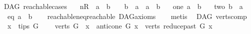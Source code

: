 \begin{isabellebody}
\endisadelimdocument
%
\isatagdocument
%
\isamarkuptrue%
%
\endisatagdocument
{\isafolddocument}%
%
\isadelimdocument
%
\endisadelimdocument
{}\isamarkupfalse%
\ {\isacharparenleft}{\kern0pt}\ DAG{\isacharparenright}{\kern0pt}\ reachable{}{\isacharunderscore}{\kern0pt}cases{\isacharcolon}{\kern0pt}\isanewline
\ \ \ {\isacharparenleft}{\kern0pt}nR{\isacharparenright}{\kern0pt}\ {\isachardoublequoteopen}{\isasymnot}\ a\ {\isasymrightarrow}\isactrlsup {\isacharplus}{\kern0pt}\ b\ {\isasymand}\ {\isasymnot}\ \ b\ {\isasymrightarrow}\isactrlsup {\isacharplus}{\kern0pt}\ a\ {\isasymand}\ a\ {\isasymnoteq}\ b{\isachardoublequoteclose}\isanewline
\ \ {\isacharbar}{\kern0pt}\ {\isacharparenleft}{\kern0pt}one{\isacharparenright}{\kern0pt}\ {\isachardoublequoteopen}a\ {\isasymrightarrow}\isactrlsup {\isacharplus}{\kern0pt}\ b{\isachardoublequoteclose}\isanewline
\ \ {\isacharbar}{\kern0pt}\ {\isacharparenleft}{\kern0pt}two{\isacharparenright}{\kern0pt}\ {\isachardoublequoteopen}b\ {\isasymrightarrow}\isactrlsup {\isacharplus}{\kern0pt}\ a{\isachardoublequoteclose}\isanewline
\ \ {\isacharbar}{\kern0pt}\ {\isacharparenleft}{\kern0pt}eq{\isacharparenright}{\kern0pt}\ {\isachardoublequoteopen}a\ {\isacharequal}{\kern0pt}\ b{\isachardoublequoteclose}\isanewline
%
\isadelimproof
\ \ %
\endisadelimproof
%
\isatagproof
{}\isamarkupfalse%
\ reachable{\isacharunderscore}{\kern0pt}neq{\isacharunderscore}{\kern0pt}reachable{}\ DAG{\isacharunderscore}{\kern0pt}axioms\isanewline
\ \ \isamarkupfalse%
\ metis%
\endisatagproof
{\isafoldproof}%
%
\isadelimproof
\isanewline
%
\endisadelimproof
\isanewline
{}\isamarkupfalse%
\ {\isacharparenleft}{\kern0pt}\ DAG{\isacharparenright}{\kern0pt}\ verts{\isacharunderscore}{\kern0pt}comp{\isacharcolon}{\kern0pt}\isanewline
\ \ \ {\isachardoublequoteopen}x\ {\isasymin}\ tips\ G{\isachardoublequoteclose}\isanewline
\ \ \ {\isachardoublequoteopen}\ verts\ G\ {\isacharequal}{\kern0pt}\ {\isacharbraceleft}{\kern0pt}x{\isacharbraceright}{\kern0pt}\ {\isasymunion}\ {\isacharparenleft}{\kern0pt}anticone\ G\ x{\isacharparenright}{\kern0pt}\ {\isasymunion}\ {\isacharparenleft}{\kern0pt}verts\ {\isacharparenleft}{\kern0pt}reduce{\isacharunderscore}{\kern0pt}past\ G\ x{\isacharparenright}{\kern0pt}{\isacharparenright}{\kern0pt}{\isachardoublequoteclose}\isanewline
%
\isadelimproof
%
\endisadelimproof
%
\isatagproof
{}\isamarkupfalse%

\end{isabellebody}
